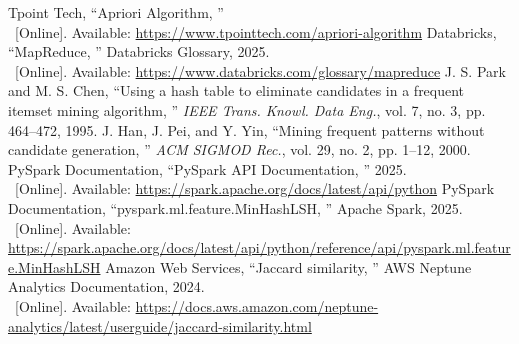 \documentclass[conference]{IEEEtran}
\begin{document}
    \begin{thebibliography}{00}
         Tpoint Tech, ``Apriori Algorithm, ''\\\
        [Online]. Available: \href{https://www.tpointtech.com/apriori-algorithm}{https://www.tpointtech.com/apriori-algorithm}
        \bibitem{b6} Databricks, ``MapReduce, '' Databricks Glossary, 2025.\\\
        [Online]. Available: \href{https://www.databricks.com/glossary/mapreduce}{https://www.databricks.com/glossary/mapreduce}
        \bibitem{b1} J. S. Park and M. S. Chen, ``Using a hash table to eliminate candidates in a frequent itemset mining algorithm, '' \textit{IEEE Trans. Knowl. Data Eng.}, vol. 7, no. 3, pp. 464--472, 1995.
        \bibitem{b2} J. Han, J. Pei, and Y. Yin, ``Mining frequent patterns without candidate generation, '' \textit{ACM SIGMOD Rec.}, vol. 29, no. 2, pp. 1--12, 2000.
        \bibitem{b3} PySpark Documentation, ``PySpark API Documentation, '' 2025.\\\
        [Online]. Available: \url{https://spark.apache.org/docs/latest/api/python}
        \bibitem{b4} PySpark Documentation, ``pyspark.ml.feature.MinHashLSH, '' Apache Spark, 2025.\\\
        [Online]. Available: \href{https://spark.apache.org/docs/latest/api/python/reference/api/pyspark.ml.feature.MinHashLSH}{https://spark.apache.org/docs/latest/api/python/refer\-ence/api/pyspark.ml.feature.MinHashLSH}
        \bibitem{b5} Amazon Web Services, ``Jaccard similarity, '' AWS Neptune Analytics Documentation, 2024.\\\
        [Online]. Available: \href{https://docs.aws.amazon.com/neptune-analytics/latest/userguide/jaccard-similarity.html}{https://docs.aws.amazon.com/neptune-analytics/latest/userguide/jaccard-similarity.html}
    \end{thebibliography}
\end{document}
